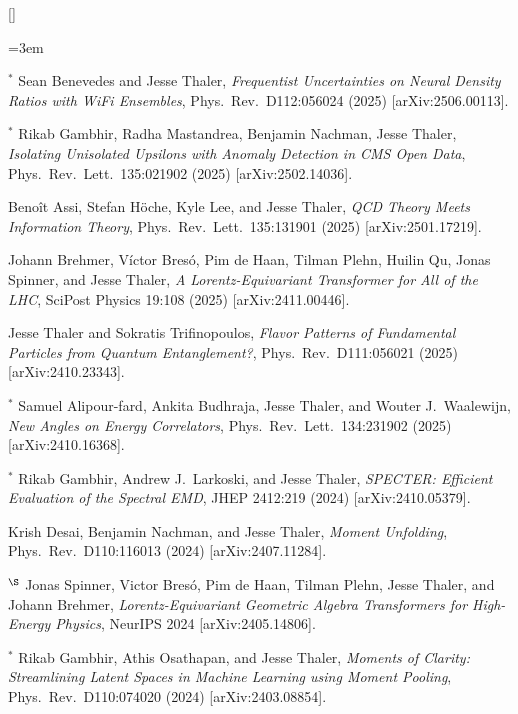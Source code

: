 \begin{list}{[]\addtocounter{jessecount}{-1}}{\leftmargin=3em \itemsep=4pt}
\item
${}^\ast$ Sean Benevedes and Jesse Thaler,
\emph{Frequentist Uncertainties on Neural Density Ratios with WiFi Ensembles},
Phys.\ Rev.\ D112:056024 (2025)
[arXiv:2506.00113].

\item
${}^\ast$ Rikab Gambhir, Radha Mastandrea, Benjamin Nachman, Jesse Thaler,
\emph{Isolating Unisolated Upsilons with Anomaly Detection in CMS Open Data},
Phys.\ Rev.\ Lett.\ 135:021902 (2025)
[arXiv:2502.14036].

\item
 Benoît Assi, Stefan Höche, Kyle Lee, and Jesse Thaler,
\emph{QCD Theory Meets Information Theory},
Phys.\ Rev.\ Lett.\ 135:131901 (2025)
[arXiv:2501.17219].

\item
 Johann Brehmer, Víctor Bresó, Pim de Haan, Tilman Plehn, Huilin Qu, Jonas Spinner, and Jesse Thaler,
\emph{A Lorentz-Equivariant Transformer for All of the LHC},
SciPost Physics 19:108 (2025)
[arXiv:2411.00446].

\item
 Jesse Thaler and Sokratis Trifinopoulos,
\emph{Flavor Patterns of Fundamental Particles from Quantum Entanglement?},
Phys.\ Rev.\ D111:056021 (2025)
[arXiv:2410.23343].

\item
${}^\ast$ Samuel Alipour-fard, Ankita Budhraja, Jesse Thaler, and Wouter J.\ Waalewijn,
\emph{New Angles on Energy Correlators},
Phys.\ Rev.\ Lett.\ 134:231902 (2025)
[arXiv:2410.16368].

\item
${}^\ast$ Rikab Gambhir, Andrew J.\ Larkoski, and Jesse Thaler,
\emph{SPECTER: Efficient Evaluation of the Spectral EMD},
JHEP 2412:219 (2024)
[arXiv:2410.05379].

\item
 Krish Desai, Benjamin Nachman, and Jesse Thaler,
\emph{Moment Unfolding},
Phys.\ Rev.\ D110:116013 (2024)
[arXiv:2407.11284].

\item
${}^\S$ Jonas Spinner, Victor Bresó, Pim de Haan, Tilman Plehn, Jesse Thaler, and Johann Brehmer,
\emph{Lorentz-Equivariant Geometric Algebra Transformers for High-Energy Physics},
NeurIPS 2024
[arXiv:2405.14806].

\item
${}^\ast$ Rikab Gambhir, Athis Osathapan, and Jesse Thaler,
\emph{Moments of Clarity: Streamlining Latent Spaces in Machine Learning using Moment Pooling},
Phys.\ Rev.\ D110:074020 (2024)
[arXiv:2403.08854].


\end{list}
